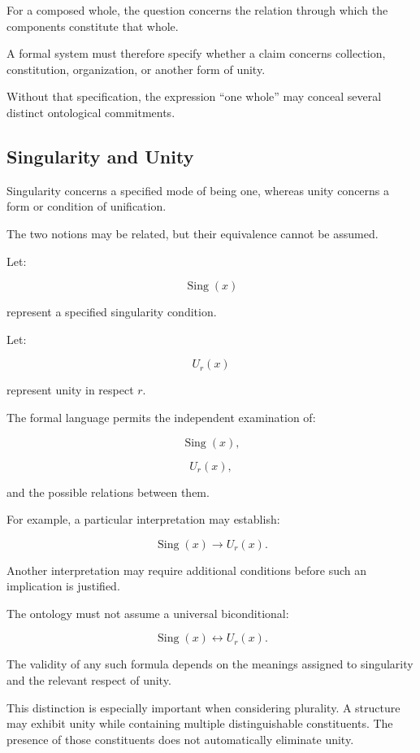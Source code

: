 For a composed whole, the question
concerns the relation through which
the components constitute that whole.

A formal system must therefore specify
whether a claim concerns collection,
constitution, organization, or another
form of unity.

Without that specification, the expression
``one whole'' may conceal several distinct
ontological commitments.

\subsection{Singularity and Unity}

Singularity concerns a specified mode
of being one, whereas unity concerns
a form or condition of unification.

The two notions may be related, but
their equivalence cannot be assumed.

Let:

\[
    \operatorname{Sing}(x)
\]

represent a specified singularity
condition.

Let:

\[
    U_r(x)
\]

represent unity in respect \(r\).

The formal language permits the
independent examination of:

\[
    \operatorname{Sing}(x),
\]

\[
    U_r(x),
\]

and the possible relations between them.

For example, a particular interpretation
may establish:

\[
    \operatorname{Sing}(x)
    \rightarrow U_r(x).
\]

Another interpretation may require
additional conditions before such an
implication is justified.

The ontology must not assume a universal
biconditional:

\[
    \operatorname{Sing}(x)
    \leftrightarrow U_r(x).
\]

The validity of any such formula depends
on the meanings assigned to singularity
and the relevant respect of unity.

This distinction is especially important
when considering plurality. A structure
may exhibit unity while containing
multiple distinguishable constituents.
The presence of those constituents does
not automatically eliminate unity.


